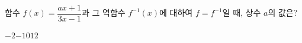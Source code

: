\hspace*{2mm}\begin{minipage}[t]{\dimexpr\linewidth-2mm\relax}\vspace{0pt}
함수 $f(x)=\dfrac{ax+1}{3x-1}$과 그 역함수 $f^{-1}(x)$에 대하여 $f=f^{-1}$일 때, 상수 $a$의 값은?
\begin{choices32}{$-2$}{$-1$}{$0$}{$1$}{$2$}\end{choices32}\end{minipage}
